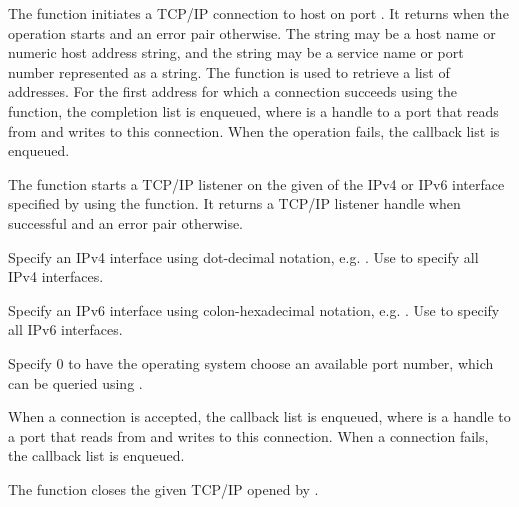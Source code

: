 The  function initiates a TCP/IP connection to
host  on port . It returns  when the
operation starts and an error pair otherwise. The  string
may be a host name or numeric host address string, and the
 string may be a service name or port number represented
as a string. The  function is used to retrieve a
list of addresses. For the first address for which a connection
succeeds using the  function, the completion
list  is enqueued, where 
is a handle to a port that reads from and writes to this
connection. When the operation fails, the callback list
 is enqueued.

\begin{function}
\end{function}

The  function starts a TCP/IP listener on the
given  of the IPv4 or IPv6 interface specified by
 using the  function. It returns a
TCP/IP listener handle when successful and an error pair otherwise.

Specify an IPv4 interface  using dot-decimal notation,
e.g. . Use  to specify all IPv4
interfaces.

Specify an IPv6 interface  using colon-hexadecimal
notation, e.g. . Use \code{::} to specify all IPv6
interfaces.

Specify  0 to have the operating system choose an available
port number, which can be queried using
.

When a connection is accepted, the callback list
 is enqueued, where  is a
handle to a port that reads from and writes to this connection. When a
connection fails, the callback list  is enqueued.

\begin{function}
\end{function}

The  function closes the given TCP/IP
 opened by .

